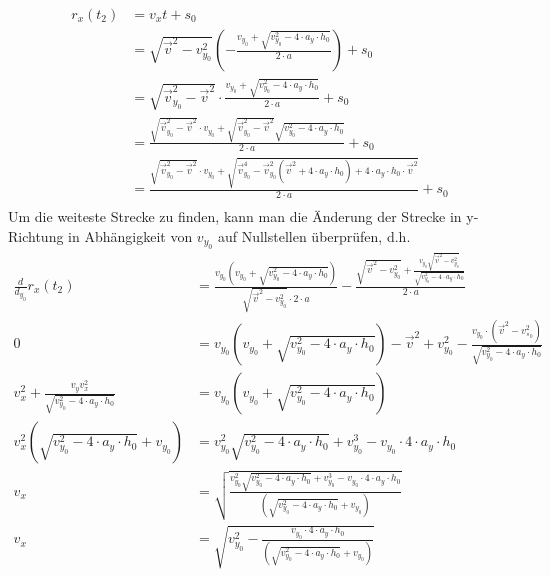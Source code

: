 \documentclass[sectionformat = aufgabe]{gadsescript}
\begin{document}
\begin{enumerate}[label=\alph*)]
		\begin{align*}
			r_x(t_2) &= v_xt + s_0\\
			~&= \sqrt{\vec v^2 - v_{y_0}^2} \left( - \frac{v_{y_0} + \sqrt{v_{y_0}^2 - 4\cdot a_y\cdot h_0}}{2\cdot a}\right) + s_0\\
			~&= \sqrt{\vec v_{y_0}^2 - \vec v^2 } \cdot \frac{v_{y_0} + \sqrt{v_{y_0}^2 - 4\cdot a_y\cdot h_0}}{2\cdot a} + s_0\\
			~&= \frac{\sqrt{\vec v_{y_0}^2 - \vec v^2 } \cdot v_{y_0} + \sqrt{\vec v_{y_0}^2 - \vec v^2 }\sqrt{v_{y_0}^2 - 4\cdot a_y\cdot h_0}}{2\cdot a} + s_0\\
			~&= \frac{\sqrt{\vec v_{y_0}^2 - \vec v^2 } \cdot v_{y_0} + \sqrt{\vec v_{y_0}^4 - \vec v_{y_0}^2 \left( \vec v^2 + 4 \cdot a_y \cdot h_0 \right) + 4\cdot a_y\cdot h_0 \cdot \vec v^2}}{2\cdot a} + s_0\\
		\end{align*}
		Um die weiteste Strecke zu finden, kann man die Änderung der Strecke in y-Richtung in Abhängigkeit von $ v_{y_0} $ auf Nullstellen überprüfen, d.h.
		\begin{align*}
			\frac{d}{d_{y_0}} r_x(t_2) &= \frac{v_{y_0}\left ( v_{y_0} + \sqrt{v_{y_0}^2 - 4 \cdot a_y\cdot h_0} \right)}{\sqrt{\vec v^2 - v_{y_0}^2} \cdot 2 \cdot a} - \frac{\sqrt{\vec v^2 - v_{y_0}^2} + \frac{v_{y_0}\sqrt{\vec v^2 - v_{y_0}^2}}{\sqrt{v_{y_0}^2 - 4 \cdot a_y \cdot h_0}}}{2\cdot a}\\
			0 &= v_{y_0}\left ( v_{y_0} + \sqrt{v_{y_0}^2 - 4 \cdot a_y\cdot h_0} \right) - {\vec v^2 + v_{y_0}^2 - \frac{v_{y_0}\cdot\left(\vec v^2 - v_{»_0}^2\right)}{\sqrt{v_{y_0}^2 - 4 \cdot a_y \cdot h_0}}}\\
			v_x^2 + \frac{v_yv_x^2}{\sqrt{v_{y_0}^2 - 4 \cdot a_y \cdot h_0}} &= v_{y_0}\left ( v_{y_0} + \sqrt{v_{y_0}^2 - 4 \cdot a_y\cdot h_0} \right) \\
			v_x^2 \left( \sqrt{v_{y_0}^2 - 4 \cdot a_y \cdot h_0} + v_{y_0} \right) &= v_{y_0}^2 \sqrt{v_{y_0}^2 - 4 \cdot a_y \cdot h_0}  + v_{y_0}^3 - v_{y_0} \cdot 4 \cdot a_y\cdot h_0\\
			v_x &= \sqrt{\frac{v_{y_0}^2 \sqrt{v_{y_0}^2 - 4 \cdot a_y \cdot h_0}  + v_{y_0}^3 - v_{y_0} \cdot 4 \cdot a_y\cdot h_0}{\left( \sqrt{v_{y_0}^2 - 4 \cdot a_y \cdot h_0} + v_{y_0} \right)}}\\
			v_x &= \sqrt{v_{y_0}^2 - \frac{v_{y_0} \cdot 4 \cdot a_y\cdot h_0}{\left( \sqrt{v_{y_0}^2 - 4 \cdot a_y \cdot h_0} + v_{y_0} \right)}}
		\end{align*}


\end{enumerate}
\end{document}
